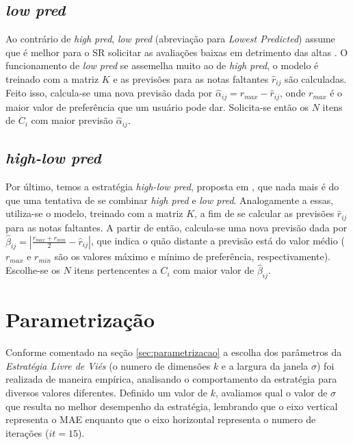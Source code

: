 \subsection{\textit{low pred}}
Ao contrário de \textit{high pred}, \textit{low pred} (abreviação para \textit{Lowest Predicted}) assume que é melhor para o SR solicitar as avaliações baixas em detrimento das altas \citep{Elahi:2014:ALS:2542182.2542195}. O funcionamento de \textit{low pred} se assemelha muito ao de \textit{high pred}, o modelo é treinado com a matriz $K$ e as previsões para as notas faltantes $\hat{r}_{ij}$ são calculadas. Feito isso, calcula-se uma nova previsão dada por $\hat{\alpha}_{ij} = r_{max}-\hat{r}_{ij}$, onde $r_{max}$ é o maior valor de preferência que um usuário pode dar. Solicita-se então os $N$ itens de $C_i$ com maior previsão $\hat{\alpha}_{ij}$.

\subsection{\textit{high-low pred}}
Por último, temos a estratégia \textit{high-low pred}, proposta em \citep{Elahi:2014:ALS:2542182.2542195}, que nada mais é do que uma tentativa de se combinar \textit{high pred} e \textit{low pred}. Analogamente a essas, utiliza-se o modelo, treinado com a matriz $K$, a fim de se calcular as previsões $\hat{r}_{ij}$ para as notas faltantes. A partir de então, calcula-se uma nova previsão dada por $\hat{\beta}_{ij} = |\frac{r_{max}+r_{min}}{2}-\hat{r}_{ij}|$, que indica o quão distante a previsão está do valor médio ($r_{max}$ e $r_{min}$ são os valores máximo e mínimo de preferência, respectivamente). Escolhe-se os $N$ itens pertencentes a $C_i$ com maior valor de $\hat{\beta}_{ij}$.

\section{Parametrização}
\label{sec:escolha-parametros}

Conforme comentado na seção \ref{sec:parametrizacao} a escolha dos parâmetros da \textit{Estratégia Livre de Viés} (o numero de dimensões $k$ e a largura da janela $\sigma$) foi realizada de maneira empírica, analisando o comportamento da estratégia para diversos valores diferentes. Definido um valor de $k$, avaliamos qual o valor de $\sigma$ que resulta no melhor desempenho da estratégia, lembrando que o eixo vertical representa o MAE enquanto que o eixo horizontal representa o numero de iterações ($it=15$). 

